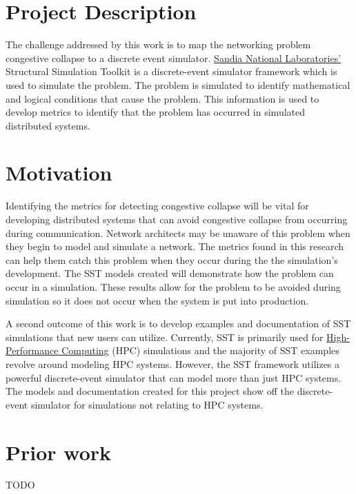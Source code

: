 \documentclass{article}
\begin{document}
\section{Project Description} %

The challenge addressed by this work is to map the networking problem congestive collapse to a discrete event simulator. \href{https://www.sandia.gov/}{Sandia National Laboratories'} Structural Simulation Toolkit is a discrete-event simulator framework which is used to simulate the problem. The problem is simulated to identify mathematical and logical conditions that cause the problem. This information is used to develop metrics to identify that the problem has occurred in simulated distributed systems.

\section{Motivation} %

Identifying the metrics for detecting congestive collapse will be vital for developing distributed systems that can avoid congestive collapse from occurring during communication. Network architects may be unaware of this problem when they begin to model and simulate a network. The metrics found in this research can help them catch this problem when they occur during the the simulation's development. The SST models created will demonstrate how the problem can occur in a simulation. These results allow for the problem to be avoided during simulation so it does not occur when the system is put into production.

A second outcome of this work is to develop examples and documentation of SST simulations that new users can utilize. Currently, SST is primarily used for \href{https://en.wikipedia.org/wiki/High-performance_computing}{High-Performance Computing} (HPC) simulations and the majority of SST examples revolve around modeling HPC systems. However, the SST framework utilizes a powerful discrete-event simulator that can model more than just HPC systems. The models and documentation created for this project show off the discrete-event simulator for simulations not relating to HPC systems.

\section{Prior work} %
TODO
\end{document}
